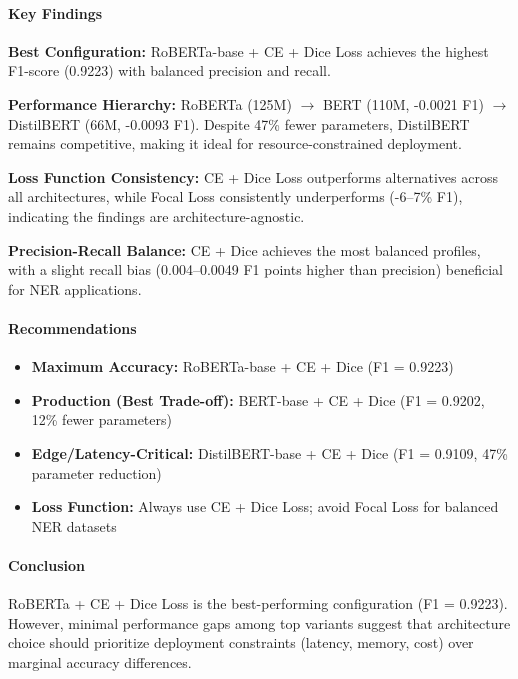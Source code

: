 \paragraph{Key Findings}

\textbf{Best Configuration:} RoBERTa-base + CE + Dice Loss achieves the highest F1-score (0.9223) with balanced precision and recall.

\textbf{Performance Hierarchy:} RoBERTa (125M) $\to$ BERT (110M, -0.0021 F1) $\to$ DistilBERT (66M, -0.0093 F1). Despite 47\% fewer parameters, DistilBERT remains competitive, making it ideal for resource-constrained deployment.

\textbf{Loss Function Consistency:} CE + Dice Loss outperforms alternatives across all architectures, while Focal Loss consistently underperforms (-6--7\% F1), indicating the findings are architecture-agnostic.

\textbf{Precision-Recall Balance:} CE + Dice achieves the most balanced profiles, with a slight recall bias (0.004--0.0049 F1 points higher than precision) beneficial for NER applications.

\paragraph{Recommendations}

\begin{itemize}
    \item \textbf{Maximum Accuracy:} RoBERTa-base + CE + Dice (F1 = 0.9223)
    \item \textbf{Production (Best Trade-off):} BERT-base + CE + Dice (F1 = 0.9202, 12\% fewer parameters)
    \item \textbf{Edge/Latency-Critical:} DistilBERT-base + CE + Dice (F1 = 0.9109, 47\% parameter reduction)
    \item \textbf{Loss Function:} Always use CE + Dice Loss; avoid Focal Loss for balanced NER datasets
\end{itemize}

\paragraph{Conclusion}

RoBERTa + CE + Dice Loss is the best-performing configuration (F1 = 0.9223). However, minimal performance gaps among top variants suggest that architecture choice should prioritize deployment constraints (latency, memory, cost) over marginal accuracy differences.

